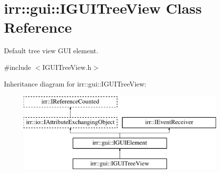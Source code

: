 \hypertarget{classirr_1_1gui_1_1IGUITreeView}{}\section{irr\+:\+:gui\+:\+:I\+G\+U\+I\+Tree\+View Class Reference}
\label{classirr_1_1gui_1_1IGUITreeView}


Default tree view G\+UI element.  




{\ttfamily \#include $<$I\+G\+U\+I\+Tree\+View.\+h$>$}

Inheritance diagram for irr\+:\+:gui\+:\+:I\+G\+U\+I\+Tree\+View\+:\begin{figure}[H]
\begin{center}
\leavevmode
\includegraphics[height=4.000000cm]{classirr_1_1gui_1_1IGUITreeView}
\end{center}
\end{figure}
